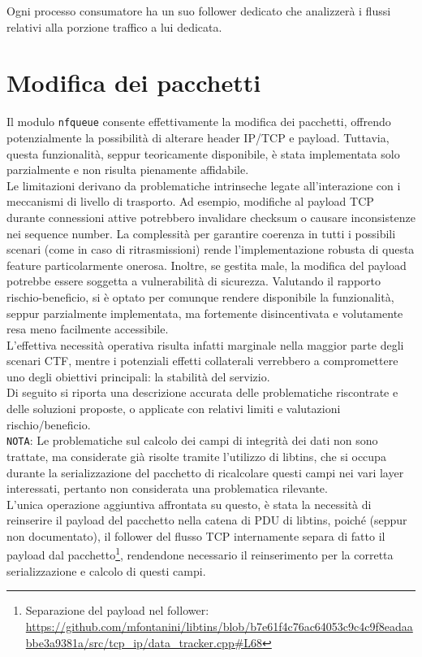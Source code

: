Ogni processo consumatore ha un suo follower dedicato che analizzerà i flussi relativi alla porzione traffico a lui dedicata.

\section{Modifica dei pacchetti}

Il modulo \texttt{nfqueue} consente effettivamente la modifica dei pacchetti, offrendo potenzialmente la possibilità di alterare header
IP/TCP e payload. Tuttavia, questa funzionalità, seppur teoricamente disponibile, è stata implementata solo parzialmente e non risulta pienamente affidabile.\\
Le limitazioni derivano da problematiche intrinseche legate all’interazione con i meccanismi di livello di trasporto. Ad esempio, modifiche al payload TCP durante connessioni attive potrebbero invalidare checksum o causare inconsistenze nei sequence number. La complessità per garantire coerenza in tutti i possibili scenari (come in caso di ritrasmissioni) rende l’implementazione robusta di questa feature particolarmente onerosa. Inoltre, se gestita male, la modifica del payload potrebbe essere soggetta a vulnerabilità di sicurezza. Valutando il rapporto rischio-beneficio, si è optato per comunque rendere disponibile la funzionalità, seppur parzialmente implementata, ma fortemente disincentivata e volutamente resa meno facilmente accessibile.\\
L’effettiva necessità operativa risulta infatti marginale nella maggior parte degli scenari CTF, mentre i potenziali effetti collaterali verrebbero a compromettere uno degli obiettivi principali: la stabilità del servizio.\\
Di seguito si riporta una descrizione accurata delle problematiche riscontrate e delle soluzioni proposte, o applicate con relativi limiti e valutazioni rischio/beneficio.\\

\texttt{NOTA}: Le problematiche sul calcolo dei campi di integrità dei dati non sono trattate, ma considerate già risolte tramite l'utilizzo di libtins, che si occupa durante la serializzazione del pacchetto di ricalcolare questi campi nei vari layer interessati, pertanto non considerata una problematica rilevante.\\
L'unica operazione aggiuntiva affrontata su questo, è stata la necessità di reinserire il payload del pacchetto nella catena di PDU di libtins, poiché (seppur non documentato), il follower del flusso TCP internamente separa di fatto il payload dal pacchetto\footnote{Separazione del payload nel follower: \url{https://github.com/mfontanini/libtins/blob/b7e61f4c76ac64053c9c4c9f8eadaabbe3a9381a/src/tcp_ip/data_tracker.cpp\#L68}}, rendendone necessario il reinserimento per la corretta serializzazione e calcolo di questi campi.\\

